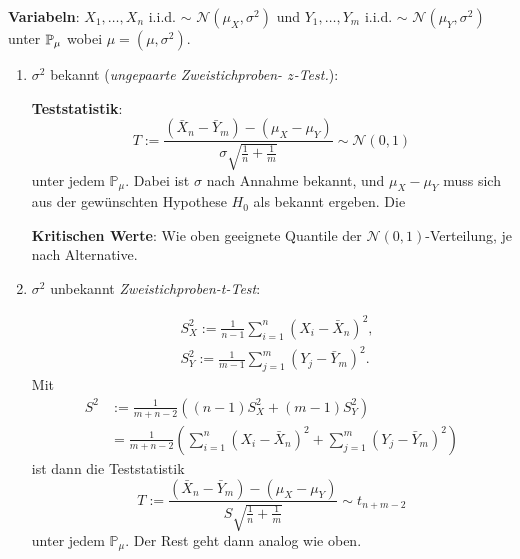 \textbf{Variabeln}: $X_1, \ldots , X_n$ i.i.d. $\sim$ $\mathcal{N}(\mu_X, \sigma^2)$ und $Y_1, \ldots , Y_m$ i.i.d. $\sim$ $\mathcal{N}(\mu_Y, \sigma^2)$ unter $\mathbb{P}_\mu$ wobei $\mu = (\mu, \sigma^2)$.
\begin{enumerate}
    \item $\sigma^{2}$ bekannt (\textit{ungepaarte Zweistichproben- $z$-Test.}): 

    \textbf{Teststatistik}:
    $$
    T:=\frac{\left(\bar{X}_{n}-\bar{Y}_{m}\right)-\left(\mu_{X}-\mu_{Y}\right)}{\sigma \sqrt{\frac{1}{n}+\frac{1}{m}}} \sim \mathcal{N}(0,1)
    $$
    unter jedem $\mathbb{P}_{\mu}$. Dabei ist $\sigma$ nach Annahme bekannt, und $\mu_{X}-\mu_{Y}$ muss sich aus der gewünschten Hypothese $H_{0}$ als bekannt ergeben. Die 
    
    \textbf{Kritischen Werte}: Wie oben geeignete Quantile der $\mathcal{N}(0,1)$-Verteilung, je nach Alternative. 
    \item $\sigma^{2}$ unbekannt \textit{Zweistichproben-t-Test}:
    
    $$
    \begin{aligned}
    &S_{X}^{2}:=\frac{1}{n-1} \sum_{i=1}^{n}\left(X_{i}-\bar{X}_{n}\right)^{2}, \\
    &S_{Y}^{2}:=\frac{1}{m-1} \sum_{j=1}^{m}\left(Y_{j}-\bar{Y}_{m}\right)^{2} .
    \end{aligned}
    $$
    Mit
    $$
    \begin{aligned}
    S^{2} &:=\frac{1}{m+n-2}\left((n-1) S_{X}^{2}+(m-1) S_{Y}^{2}\right) \\
    &=\frac{1}{m+n-2}\left(\sum_{i=1}^{n}\left(X_{i}-\bar{X}_{n}\right)^{2}+\sum_{j=1}^{m}\left(Y_{j}-\bar{Y}_{m}\right)^{2}\right)
    \end{aligned}
    $$
    ist dann die Teststatistik
    $$
    T:=\frac{\left(\bar{X}_{n}-\bar{Y}_{m}\right)-\left(\mu_{X}-\mu_{Y}\right)}{S \sqrt{\frac{1}{n}+\frac{1}{m}}} \sim t_{n+m-2}
    $$
    unter jedem $\mathbb{P}_{\mu}$. Der Rest geht dann analog wie oben.
\end{enumerate}